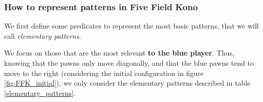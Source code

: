 \documentclass[12pt,twoside]{report}
\begin{document}
\subsubsection{How to represent patterns in Five Field Kono}

We first define some predicates to represent the most basic patterns, that we will call \textit{elementary patterns}.

\smallskip

We focus on those that are the most relevant \textbf{to the blue player}. Thus, knowing that the pawns only move diagonally, and that the blue pawns tend to move to the right (considering the initial configuration in figure \ref{fig:FFK_initial}), we only consider the elementary patterns described in table \ref{elementary_patterns}.

\end{document}
